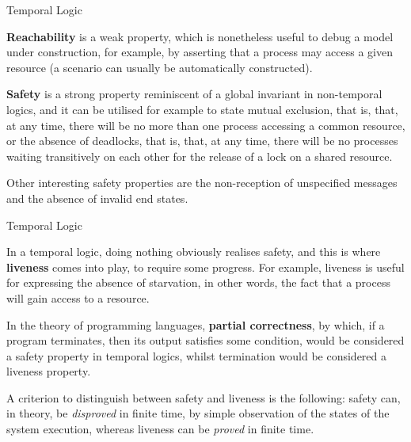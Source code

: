 \documentclass[compress,dvips,xcolor={dvipsnames},t]{beamer}
\begin{document}
%
\begin{frame}{Temporal Logic}

  \textbf{Reachability} is a weak property, which is nonetheless useful to
  debug a model under construction, for example, by asserting that a
  process may access a given resource (a scenario can usually be
  automatically constructed).

  \bigskip

  \textbf{Safety} is a strong property reminiscent of a global
  invariant in non\hyp{}temporal logics, and it can be utilised for
  example to state mutual exclusion, that is, that, at any time, there
  will be no more than one process accessing a common resource, or the
  absence of deadlocks, that is, that, at any time, there will be no
  processes waiting transitively on each other for the release of a
  lock on a shared resource.

  \bigskip

  Other interesting safety properties are the non\hyp{}reception of
  unspecified messages and the absence of invalid end states.

\end{frame}

%
\begin{frame}{Temporal Logic}

  In a temporal logic, doing nothing obviously realises safety, and
  this is where \textbf{liveness} comes into play, to require some
  progress. For example, liveness is useful for expressing the absence
  of starvation, in other words, the fact that a process will gain
  access to a resource.

  \bigskip

  In the theory of programming languages, \textbf{partial
    correctness}, by which, if a program terminates, then its output
  satisfies some condition, would be considered a safety property in
  temporal logics, whilst termination would be considered a liveness
  property.

  \bigskip

  A criterion to distinguish between safety and liveness is the
  following: safety can, in theory, be \emph{disproved} in finite
  time, by simple observation of the states of the system execution,
  whereas liveness can be \emph{proved} in finite time.

\end{frame}
\end{document}
